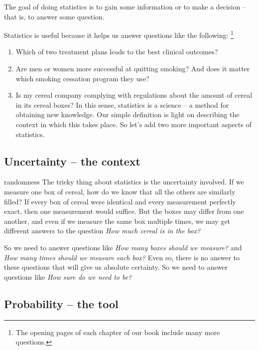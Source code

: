 \documentclass[]{book}
\providecommand{\tightlist}{%
  \setlength{\itemsep}{0pt}\setlength{\parskip}{0pt}}
\let\rmarkdownfootnote\footnote%
\def\footnote{\protect\rmarkdownfootnote}
\begin{document}
The goal of doing statistics is to gain some information or to make a decision -- that is, to answer some question.

Statistics is useful because it helps us answer questions like the following:
\footnote{The opening pages of each chapter of our book include many more questions.}

\begin{enumerate}
\tightlist
\item
  Which of two treatment plans leads to the best clinical outcomes?
\item
  Are men or women more successful at quitting smoking? And does it matter which smoking cessation program they use?
\item
  Is my cereal company complying with regulations about the amount of cereal in its cereal boxes?
  In this sense, statistics is a science -- a method for obtaining new knowledge.
  Our simple definition is light on describing the context in which this takes place.
  So let's add two more important aspects of statistics.
\end{enumerate}

\hypertarget{uncertainty-the-context}{%
\subsection{Uncertainty -- the context}\label{uncertainty-the-context}}

randomness
The tricky thing about statistics is the uncertainty involved. If we measure one box of cereal, how do we know that all the others are similarly filled? If every box of cereal were identical and every measurement perfectly exact, then one measurement would suffice. But the boxes may differ from one another, and even if we measure the same box multiple times, we may get different answers to the question
\emph{How much cereal is in the box?}

So we need to answer questions like
\emph{How many boxes should we measure?}
and
\emph{How many times should we measure each box?}
Even so, there is no answer to these questions
that will give us absolute certainty.
So we need to answer questions like
\emph{How sure do we need to be?}

\hypertarget{probability-the-tool}{%
\subsection{Probability -- the tool}\label{probability-the-tool}}
\end{document}
